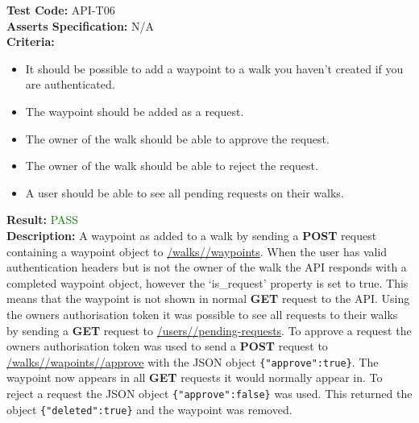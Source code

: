 \documentclass[11pt,a4paper]{report}
\begin{document}
\label{test:API-T06}
\noindent\textbf{Test Code:} API-T06\\
\textbf{Asserts Specification:} N/A \\ 
\textbf{Criteria:} \begin{itemize}
                     \item It should be possible to add a waypoint to a walk you haven't created if you are authenticated. 
                     \item The waypoint should be added as a request.
                     \item The owner of the walk should be able to approve the request.
                     \item The owner of the walk should be able to reject the request.
                     \item A user should be able to see all pending requests on their walks.
                   \end{itemize}  
                   
\textbf{Result:} \textcolor{green}{PASS}\\ 
\textbf{Description:} A waypoint as added to a walk by sending a \textbf{POST} request containing a waypoint object to \url{/walks/}\url{/waypoints}. When the user has valid authentication headers but is not the owner of the walk the API responds with a completed waypoint object, however the `is\_request' property is set to true. This means that the waypoint is not shown in normal \textbf{GET} request to the API. Using the owners authorisation token it was possible to see all requests to their walks by sending a \textbf{GET} request to \url{/users/}\url{/pending-requests}. To approve a request the owners authorisation token was used to send a \textbf{POST} request to \url{/walks/}\url{/wapoints/}\url{/approve} with the JSON object \lstinline${"approve":true}$. The waypoint now appears in all \textbf{GET} requests it would normally appear in. To reject a request the JSON object \lstinline${"approve":false}$ was used. This returned the object \lstinline${"deleted":true}$ and the waypoint was removed.\\
\end{document}
